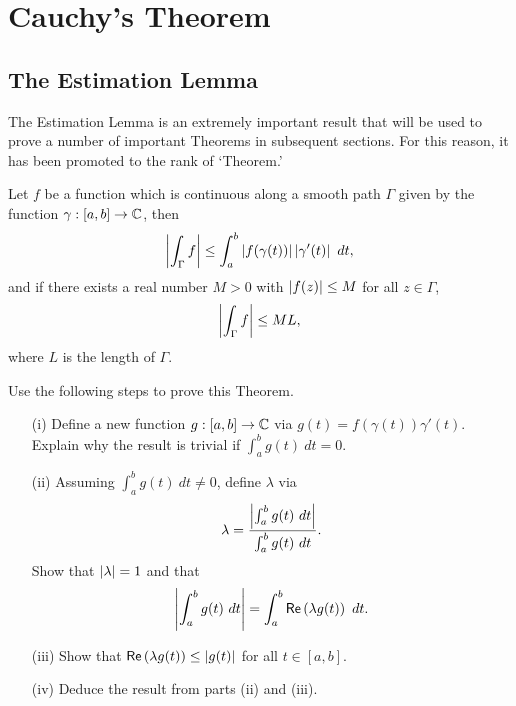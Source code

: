 
\chapter{Cauchy's Theorem}
\section{The Estimation Lemma}
The Estimation Lemma is an extremely important result that will be used to prove a number of important Theorems in subsequent sections.  For this reason, it has been promoted to the rank of `Theorem.'

\begin{theorem}
Let $f$ be a function which is continuous along a smooth path $\Gamma$ given by the function $\gamma : [a,b] \to \mathbb{C}$, then
\[
\left|  \int_{\Gamma} f  \right| \leq \int_a^b \left|  f(\gamma(t)) \right| \left|  \gamma' (t)  \right|\ dt,
\] 
 and if there exists a real number $M>0$ with $\left| f(z) \right| \leq M$ for all $z \in \Gamma$,
\[
\left| \int_{\Gamma} f \right| \leq ML,
\]
where $L$ is the length of $\Gamma$.
\end{theorem}
\begin{exercise}
Use the following steps to prove this Theorem.  
\begin{enumerate}
\item[(i)]  Define a new function $g:[a,b] \to \mathbb{C}$ via $\displaystyle g(t)=f(\gamma(t))\gamma' (t)$.  Explain why the result is trivial if $\displaystyle \int_a^b g(t)\ dt =0$.

\item[(ii)] Assuming $\displaystyle \int_a^b g(t)\ dt \neq 0$, define $\lambda$ via 
\[
\lambda = \frac{\abs{\int_a^b g(t)\ dt}}{\int_a^b g(t)\ dt}.
\]
Show that $\left| \lambda \right|=1$ and that
\[
\left| \int_a^b g(t)\ dt  \right| = \int_a^b \textsf{Re} \left(  \lambda g(t)  \right)\ dt.
\]
\item[(iii)] Show that $\textsf{Re} \left(  \lambda g(t)  \right) \leq \left| g(t) \right|$ for all $t \in [a,b]$.
\item[(iv)] Deduce the result from parts (ii) and (iii).
\end{enumerate}
\end{exercise}

